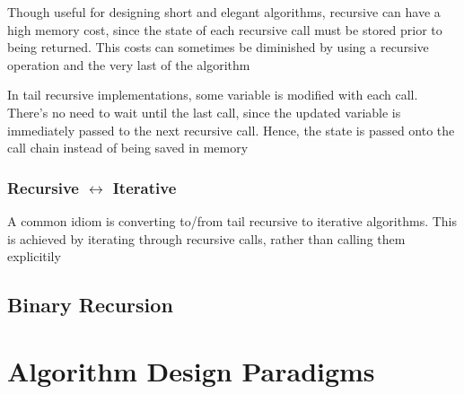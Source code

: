 \par{Though useful for designing short and elegant algorithms, recursive can
have a high memory cost, since the state of each recursive call must be stored
prior to being returned. This costs can sometimes be diminished by using a
recursive operation and the very last of the algorithm}


\par{In tail recursive implementations, some variable is modified with each
call. There's no need to wait until the last call, since the updated variable is
immediately passed to the next recursive call. Hence, the state is passed onto
the call chain instead of being saved in memory}

\subsubsection{Recursive $\leftrightarrow$ Iterative}

\par{A common idiom is converting to/from tail recursive to iterative
algorithms. This is achieved by iterating through recursive calls, rather than
calling them explicitily}



\subsection{Binary Recursion}




\section{Algorithm Design Paradigms}

